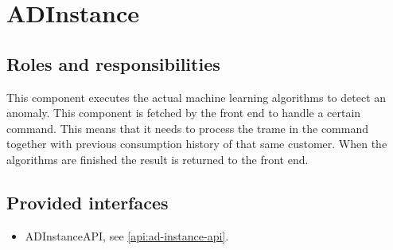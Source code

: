 \section{ADInstance}
\label{element:ad-instance}

\subsection{Roles and responsibilities}

\npar This component executes the actual machine learning algorithms to detect
an anomaly. This component is fetched by the front end to handle a certain
command. This means that it needs to process the trame in the command together
with previous consumption history of that same customer. When the algorithms are
finished the result is returned to the front end.

\subsection{Provided interfaces}

\begin{itemize}
  \item ADInstanceAPI, see \ref{api:ad-instance-api}.
\end{itemize}



